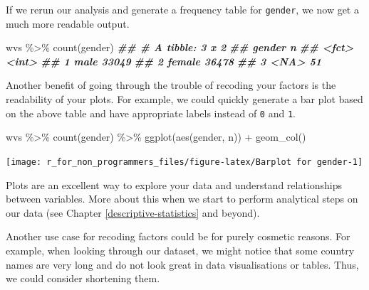 \documentclass[
]{book}
\newenvironment{Shaded}{\begin{snugshade}}{\end{snugshade}}
\newcommand{\DocumentationTok}[1]{\textcolor[rgb]{0.56,0.35,0.01}{\textbf{\textit{#1}}}}
\newcommand{\FunctionTok}[1]{\textcolor[rgb]{0.00,0.00,0.00}{#1}}
\newcommand{\NormalTok}[1]{#1}
\newcommand{\SpecialCharTok}[1]{\textcolor[rgb]{0.00,0.00,0.00}{#1}}
\begin{document}
If we rerun our analysis and generate a frequency table for \texttt{gender}, we now get a much more readable output.

\begin{Shaded}
\begin{Highlighting}[]
\NormalTok{wvs }\SpecialCharTok{\%\textgreater{}\%} \FunctionTok{count}\NormalTok{(gender)}
\DocumentationTok{\#\# \# A tibble: 3 x 2}
\DocumentationTok{\#\#   gender     n}
\DocumentationTok{\#\#   \textless{}fct\textgreater{}  \textless{}int\textgreater{}}
\DocumentationTok{\#\# 1 male   33049}
\DocumentationTok{\#\# 2 female 36478}
\DocumentationTok{\#\# 3 \textless{}NA\textgreater{}      51}
\end{Highlighting}
\end{Shaded}

Another benefit of going through the trouble of recoding your factors is the readability of your plots. For example, we could quickly generate a bar plot based on the above table and have appropriate labels instead of \texttt{0} and \texttt{1}.

\begin{Shaded}
\begin{Highlighting}[]
\NormalTok{wvs }\SpecialCharTok{\%\textgreater{}\%}
  \FunctionTok{count}\NormalTok{(gender) }\SpecialCharTok{\%\textgreater{}\%}
  \FunctionTok{ggplot}\NormalTok{(}\FunctionTok{aes}\NormalTok{(gender, n)) }\SpecialCharTok{+}
  \FunctionTok{geom\_col}\NormalTok{()}
\end{Highlighting}
\end{Shaded}

\begin{center}\texttt{[image: r\_for\_non\_programmers\_files/figure-latex/Barplot for gender-1]} \end{center}

Plots are an excellent way to explore your data and understand relationships between variables. More about this when we start to perform analytical steps on our data (see Chapter \ref{descriptive-statistics} and beyond).

Another use case for recoding factors could be for purely cosmetic reasons. For example, when looking through our dataset, we might notice that some country names are very long and do not look great in data visualisations or tables. Thus, we could consider shortening them.
\end{document}

